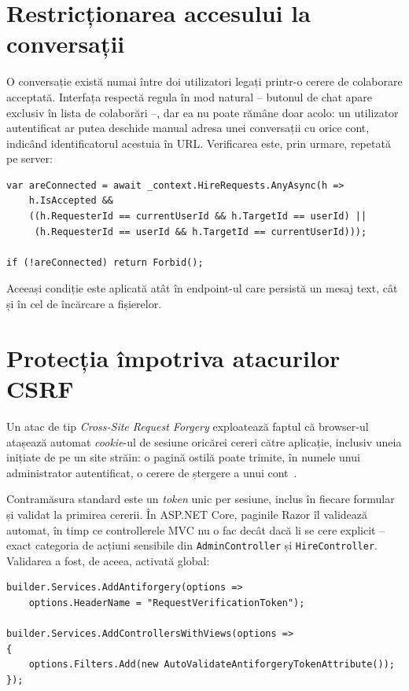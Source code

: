 \section{Restricționarea accesului la conversații}

O conversație există numai între doi utilizatori legați printr-o cerere de
colaborare acceptată. Interfața respectă regula în mod natural -- butonul de chat
apare exclusiv în lista de colaborări --, dar ea nu poate rămâne doar acolo: un
utilizator autentificat ar putea deschide manual adresa unei conversații cu orice
cont, indicând identificatorul acestuia în URL. Verificarea este, prin urmare,
repetată pe server:

\begin{lstlisting}[caption={Verificarea existenței unei colaborări acceptate}]
var areConnected = await _context.HireRequests.AnyAsync(h =>
    h.IsAccepted &&
    ((h.RequesterId == currentUserId && h.TargetId == userId) ||
     (h.RequesterId == userId && h.TargetId == currentUserId)));

if (!areConnected) return Forbid();
\end{lstlisting}

Aceeași condiție este aplicată atât în endpoint-ul care persistă un mesaj text,
cât și în cel de încărcare a fișierelor.

\section{Protecția împotriva atacurilor CSRF}

Un atac de tip \emph{Cross-Site Request Forgery} exploatează faptul că browser-ul
atașează automat \emph{cookie}-ul de sesiune oricărei cereri către aplicație,
inclusiv uneia inițiate de pe un site străin: o pagină ostilă poate trimite, în
numele unui administrator autentificat, o cerere de ștergere a unui
cont~\cite{owasp-top10}.

Contramăsura standard este un \emph{token} unic per sesiune, inclus în fiecare
formular și validat la primirea cererii. În ASP.NET Core, paginile Razor îl
validează automat, în timp ce controllerele MVC nu o fac decât dacă li se cere
explicit -- exact categoria de acțiuni sensibile din \texttt{AdminController} și
\texttt{HireController}. Validarea a fost, de aceea, activată global:

\begin{lstlisting}[caption={Activarea globală a validării token-ului antiforgery}]
builder.Services.AddAntiforgery(options =>
    options.HeaderName = "RequestVerificationToken");

builder.Services.AddControllersWithViews(options =>
{
    options.Filters.Add(new AutoValidateAntiforgeryTokenAttribute());
});
\end{lstlisting}

